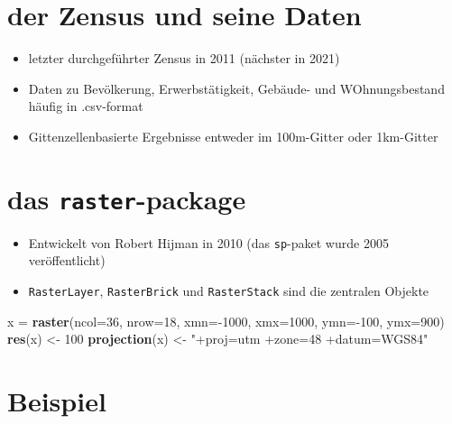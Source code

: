 \documentclass[]{tufte-handout}
\newenvironment{Shaded}{}{}
\newcommand{\DataTypeTok}[1]{\textcolor[rgb]{0.56,0.13,0.00}{#1}}
\newcommand{\DecValTok}[1]{\textcolor[rgb]{0.25,0.63,0.44}{#1}}
\newcommand{\KeywordTok}[1]{\textcolor[rgb]{0.00,0.44,0.13}{\textbf{#1}}}
\newcommand{\NormalTok}[1]{#1}
\newcommand{\OperatorTok}[1]{\textcolor[rgb]{0.40,0.40,0.40}{#1}}
\newcommand{\StringTok}[1]{\textcolor[rgb]{0.25,0.44,0.63}{#1}}
\providecommand{\tightlist}{%
  \setlength{\itemsep}{0pt}\setlength{\parskip}{0pt}}
\begin{document}
\hypertarget{der-zensus-und-seine-daten}{%
\section{der Zensus und seine Daten}\label{der-zensus-und-seine-daten}}

\begin{itemize}
\tightlist
\item
  letzter durchgeführter Zensus in 2011 (nächster in 2021)
\item
  Daten zu Bevölkerung, Erwerbstätigkeit, Gebäude- und WOhnungsbestand
  häufig in .csv-format
\item
  Gittenzellenbasierte Ergebnisse entweder im 100m-Gitter oder
  1km-Gitter
\end{itemize}

\hypertarget{das-raster-package}{%
\section{\texorpdfstring{das
\texttt{raster}-package}{das raster-package}}\label{das-raster-package}}

\begin{itemize}
\tightlist
\item
  Entwickelt von Robert Hijman in 2010 (das \texttt{sp}-paket wurde 2005
  veröffentlicht)
\item
  \texttt{RasterLayer}, \texttt{RasterBrick} und \texttt{RasterStack}
  sind die zentralen Objekte
\end{itemize}

\begin{Shaded}
\begin{Highlighting}[]
\NormalTok{x =}\StringTok{ }\KeywordTok{raster}\NormalTok{(}\DataTypeTok{ncol=}\DecValTok{36}\NormalTok{, }\DataTypeTok{nrow=}\DecValTok{18}\NormalTok{, }\DataTypeTok{xmn=}\OperatorTok{-}\DecValTok{1000}\NormalTok{, }\DataTypeTok{xmx=}\DecValTok{1000}\NormalTok{, }\DataTypeTok{ymn=}\OperatorTok{-}\DecValTok{100}\NormalTok{, }\DataTypeTok{ymx=}\DecValTok{900}\NormalTok{)}
\KeywordTok{res}\NormalTok{(x) <-}\StringTok{ }\DecValTok{100}
\KeywordTok{projection}\NormalTok{(x) <-}\StringTok{ "+proj=utm +zone=48 +datum=WGS84"} 
\end{Highlighting}
\end{Shaded}

\hypertarget{beispiel}{%
\section{Beispiel}\label{beispiel}}

\renewcommand\refname{References}

\end{document}
